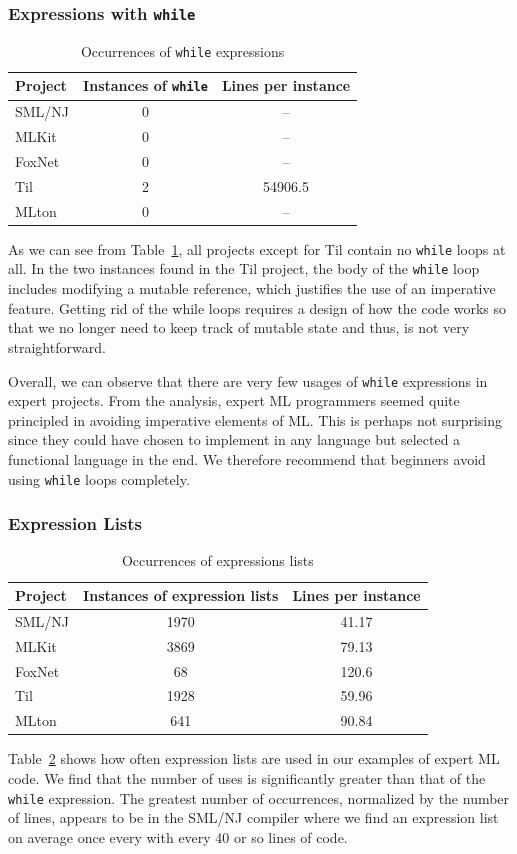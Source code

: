 \documentclass[12pt,abstracton]{scrartcl}
\begin{document}
\subsubsection{Expressions with \texttt{while}}
\begin{table}[h!]
\centering
\begin{tabular}{|l||c|c|}
\hline
Project & Instances of \texttt{while} & Lines per instance \\ \hline\hline
SML/NJ & 0 & --\\
MLKit & 0 & --\\
FoxNet & 0 & -- \\
Til & 2 & 54906.5 \\
MLton & 0 & --\\ \hline
\end{tabular}
\caption{Occurrences of \texttt{while} expressions}
\label{table:while}
\end{table}
As we can see from Table~\ref{table:while}, all projects except for Til
contain no \texttt{while} loops at all.
In the two instances found in the Til project, the body of the \texttt{while}
loop includes modifying a mutable reference, which justifies the use of
an imperative feature. Getting rid of the while loops requires a design of how the code works so
that we no longer need to keep track of mutable state and thus, is not very straightforward.

Overall, we can observe that there are very few usages of \texttt{while} expressions
in expert projects.
From the analysis, expert ML programmers seemed quite principled in avoiding imperative
elements of ML. This is perhaps not surprising since they could have chosen
to implement in any language but selected a functional language in the end.
We therefore recommend that beginners avoid using \texttt{while} loops completely.
\subsubsection{Expression Lists}
\begin{table}[h!]
\centering
\begin{tabular}{|l||c|c|}
\hline
Project & Instances of expression lists & Lines per instance \\ \hline\hline
SML/NJ & 1970 & 41.17 \\
MLKit & 3869 & 79.13 \\
FoxNet & 68 & 120.6 \\
Til & 1928 & 59.96 \\
MLton & 641 & 90.84 \\ \hline
\end{tabular}
\caption{Occurrences of expressions lists}
\label{table:explist}
\end{table}
Table~\ref{table:explist} shows how often expression lists are used in our
examples of expert ML code. We find that the number of uses is significantly
greater than that of the \texttt{while} expression. The greatest number
of occurrences, normalized by the number of lines, appears to be in the SML/NJ
compiler where we find an expression list on average once every with every
40 or so lines of code.
\end{document}
